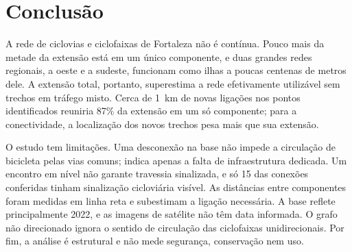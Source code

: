 \documentclass[10pt,twoside,a4paper]{article}
\begin{document}
\section{Conclusão}
A rede de ciclovias e ciclofaixas de Fortaleza não é contínua. Pouco mais da metade da extensão está em um único componente, e duas grandes redes regionais, a oeste e a sudeste, funcionam como ilhas a poucas centenas de metros dele. A extensão total, portanto, superestima a rede efetivamente utilizável sem trechos em tráfego misto. Cerca de 1~km de novas ligações nos pontos identificados reuniria 87\% da extensão em um só componente; para a conectividade, a localização dos novos trechos pesa mais que sua extensão.

O estudo tem limitações. Uma desconexão na base não impede a circulação de bicicleta pelas vias comuns; indica apenas a falta de infraestrutura dedicada. Um encontro em nível não garante travessia sinalizada, e só 15 das conexões conferidas tinham sinalização cicloviária visível. As distâncias entre componentes foram medidas em linha reta e subestimam a ligação necessária. A base reflete principalmente 2022, e as imagens de satélite não têm data informada. O grafo não direcionado ignora o sentido de circulação das ciclofaixas unidirecionais. Por fim, a análise é estrutural e não mede segurança, conservação nem uso.
\end{document}
